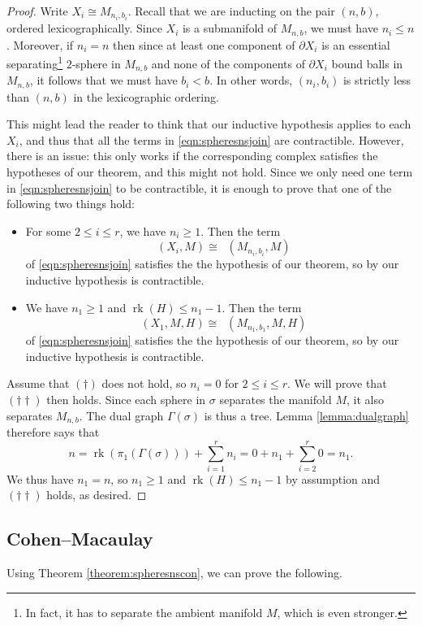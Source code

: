 \documentclass[11pt]{amsart}
\numberwithin{equation}{section}
\theoremstyle{plain}
\theoremstyle{definition}
\theoremstyle{remark}
\DeclareMathOperator{\rank}{rk}
\DeclareMathOperator{\Spheres}{\mathcal{S}}
\DeclareMathOperator{\SpheresNS}{\Spheres_{\text{ns}}}
\begin{document}
\begin{proof}
Write $X_i \cong M_{n_i,b_i}$.  Recall that we are inducting on the pair $(n,b)$, ordered
lexicographically.  Since $X_i$ is a submanifold of $M_{n,b}$, we must have $n_i \leq n$.  Moreover,
if $n_i = n$ then since at least one component of $\partial X_i$ is an essential 
separating\footnote{In fact,
it has to separate the ambient manifold $M$, which is even stronger.}
$2$-sphere in $M_{n,b}$ and none of the components of $\partial X_i$ bound
balls in $M_{n,b}$, it follows that we must have $b_i < b$.  In other words, $(n_i,b_i)$ is
strictly less than $(n,b)$ in the lexicographic ordering.

This might lead the reader to think that our inductive hypothesis applies to each
$X_i$, and thus that all the terms in \eqref{eqn:spheresnsjoin} are contractible.  However,
there is an issue: this only works if the corresponding complex satisfies
the hypotheses of our theorem, and this might not hold.  Since we only need one
term in \eqref{eqn:spheresnsjoin} to be contractible, it is enough to prove
that one of the following two things hold:
\begin{itemize}
\item[$(\dagger)$] For some $2 \leq i \leq r$, we have $n_i \geq 1$.  Then the term
\[\SpheresNS(X_i,M) \cong \SpheresNS(M_{n_i,b_i},M)\] 
of \eqref{eqn:spheresnsjoin} satisfies the the hypothesis
of our theorem, so by our inductive hypothesis is contractible.
\item[$(\dagger\dagger)$] We have $n_1 \geq 1$ and $\rank(H) \leq n_1-1$.  Then the term
\[\SpheresNS(X_1,M,H) \cong \SpheresNS(M_{n_1,b_1},M,H)\] 
of \eqref{eqn:spheresnsjoin} satisfies the the hypothesis
of our theorem, so by our inductive hypothesis is contractible.
\end{itemize}
Assume that $(\dagger)$ does not hold, so $n_i = 0$ for $2 \leq i \leq r$.  We will prove that $(\dagger\dagger)$ then holds.
Since each sphere in $\sigma$ separates the manifold $M$, it also separates $M_{n,b}$.  The
dual graph $\Gamma(\sigma)$ is thus a tree.  Lemma \ref{lemma:dualgraph} therefore says that
\[n = \rank(\pi_1(\Gamma(\sigma))) + \sum_{i=1}^r n_i = 0 + n_1 + \sum_{i=2}^r 0 = n_1.\]
We thus have $n_1 = n$, so $n_1 \geq 1$ and $\rank(H) \leq n_1-1$ by assumption and
$(\dagger\dagger)$ holds, as desired.
\end{proof}

\subsection{Cohen--Macaulay}
Using Theorem \ref{theorem:spheresnscon}, we can prove the following.
\end{document}
